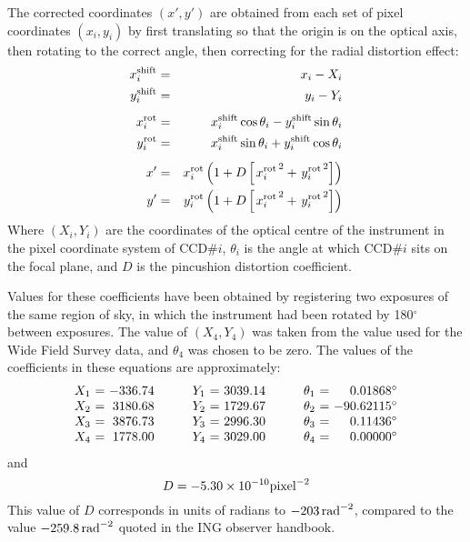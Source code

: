 \documentclass[twoside,11pt]{article}
\newcommand{\htmladdnormallink}[2]{#1}
\newcommand{\latexhtml}[2]{#1}
\renewcommand{\_}{\texttt{\symbol{95}}}
\begin{document}
The corrected coordinates $(x', y')$ are obtained from
each set of pixel coordinates $(x_i, y_i)$
by first translating so that the origin is on the optical
axis, then rotating to the correct angle,
then correcting for the radial distortion effect:
\begin{eqnarray*}
  x_i^{\rm shift} & = & x_i - X_i \\
  y_i^{\rm shift} & = & y_i - Y_i \\[1ex]
%
  x_i^{\rm rot}   & = & x_i^{\rm shift} \cos \theta_i
                      - y_i^{\rm shift} \sin \theta_i  \\
  y_i^{\rm rot}   & = & x_i^{\rm shift} \sin \theta_i
                      + y_i^{\rm shift} \cos \theta_i  \\[1ex]
%
  x'              & = & x_i^{\rm rot}
                        \left( 1 + D \left[ \left. x_i^{\rm rot} \right.^2
                                          + \left. y_i^{\rm rot} \right.^2
                                     \right] \right)  \\
  y'              & = & y_i^{\rm rot}
                        \left( 1 + D \left[ \left. x_i^{\rm rot} \right.^2
                                          + \left. y_i^{\rm rot} \right.^2
                                     \right] \right)
\end{eqnarray*}
Where $(X_i, Y_i)$ are the coordinates of the optical centre of
the instrument in the pixel coordinate system of CCD\#$i$,
$\theta_i$ is the angle at which CCD\#$i$ sits on the focal plane,
and $D$ is the pincushion distortion coefficient.

Values for these coefficients have been obtained by registering
two exposures of the same region of sky, in which the instrument
had been rotated by 180$^\circ$ between exposures.
The value of $(X_4, Y_4)$ was taken from the value used
for the
\htmladdnormallink{Wide Field Survey}{http://www.ast.cam.ac.uk/~wfcsur/astrometry.html}
data, and $\theta_4$ was chosen to be zero.
The values of the coefficients in these equations are approximately:
\begin{displaymath}
  \begin{array}{c@{\ =\ }r@{\hspace{3em}}c@{\ =\ }r@{\hspace{3em}}c@{\ =\ }r}
     X_1 & -336.74  &  Y_1 & 3039.14  &  \theta_1 &   0.01868^\circ  \\
     X_2 & 3180.68  &  Y_2 & 1729.67  &  \theta_2 & -90.62115^\circ  \\
     X_3 & 3876.73  &  Y_3 & 2996.30  &  \theta_3 &   0.11436^\circ  \\
     X_4 & 1778.00  &  Y_4 & 3029.00  &  \theta_4 &   0.00000^\circ
  \end{array}
\end{displaymath}
and
\begin{displaymath}
     D = -5.30 \times 10^{-10} {\rm pixel}^{-2}
\end{displaymath}
This value of $D$ corresponds in units of radians to
\latexhtml{$-203\,{\rm rad}^{-2}$}{-203 rad$^{-2}$},
compared to the value
\latexhtml{$-259.8\,{\rm rad}^{-2}$}{-259.8 rad$^{-2}$}
quoted in the ING observer handbook.
\end{document}
